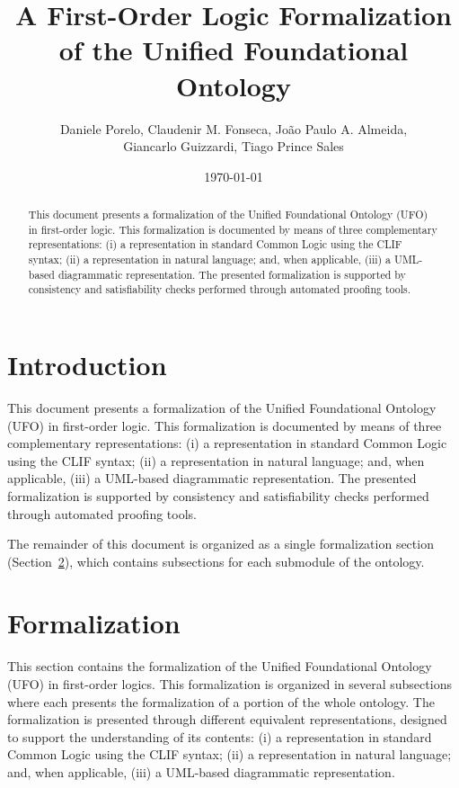 \documentclass{article}
\title{A First-Order Logic Formalization of the Unified Foundational Ontology}
\author{
    Daniele Porelo,
    Claudenir M. Fonseca,
    Jo\~ao Paulo A. Almeida,\\
    Giancarlo Guizzardi,
    Tiago Prince Sales
}
\date{\today}
\begin{document}
\maketitle

\begin{abstract}
This document presents a formalization of the Unified Foundational Ontology (UFO) in first-order logic. This formalization is documented by means of three complementary representations: (i) a representation in standard Common Logic using the CLIF syntax; (ii) a representation in natural language; and, when applicable, (iii) a UML-based diagrammatic representation. The presented formalization is supported by consistency and satisfiability checks performed through automated proofing tools.
\end{abstract}

\section{Introduction}

This document presents a formalization of the Unified Foundational Ontology (UFO) in first-order logic. This formalization is documented by means of three complementary representations: (i) a representation in standard Common Logic using the CLIF syntax; (ii) a representation in natural language; and, when applicable, (iii) a UML-based diagrammatic representation. The presented formalization is supported by consistency and satisfiability checks performed through automated proofing tools.

The remainder of this document is organized as a single formalization section (Section~\ref{sec:formalization}), which contains subsections for each submodule of the ontology.

\section{Formalization}
\label{sec:formalization}

This section contains the formalization of the Unified Foundational Ontology (UFO) in first-order logics. This formalization is organized in several subsections where each presents the formalization of a portion of the whole ontology. The formalization is presented through different equivalent representations, designed to support the understanding of its contents: (i) a representation in standard Common Logic using the CLIF syntax; (ii) a representation in natural language; and, when applicable, (iii) a UML-based diagrammatic representation.
\end{document}
